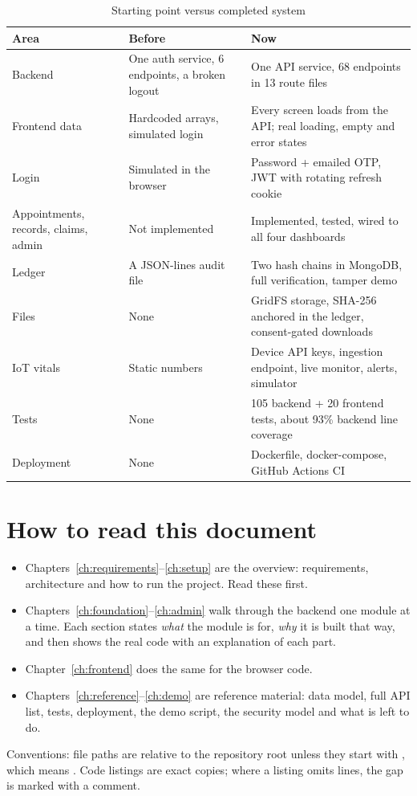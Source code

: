 \begin{table}[H]
\centering\small
\caption{Starting point versus completed system}\label{tab:before-after}
\begin{tabularx}{\textwidth}{@{}P{3.4cm}YY@{}}
\toprule
\textbf{Area} & \textbf{Before} & \textbf{Now} \\
\midrule
Backend & One auth service, 6 endpoints, a broken logout & One API service, 68 endpoints in 13 route files \\
Frontend data & Hardcoded arrays, simulated login & Every screen loads from the API; real loading, empty and error states \\
Login & Simulated in the browser & Password + emailed OTP, JWT with rotating refresh cookie \\
Appointments, records, claims, admin & Not implemented & Implemented, tested, wired to all four dashboards \\
Ledger & A JSON-lines audit file & Two hash chains in MongoDB, full verification, tamper demo \\
Files & None & GridFS storage, SHA-256 anchored in the ledger, consent-gated downloads \\
IoT vitals & Static numbers & Device API keys, ingestion endpoint, live monitor, alerts, simulator \\
Tests & None & 105 backend + 20 frontend tests, about 93\% backend line coverage \\
Deployment & None & Dockerfile, docker-compose, GitHub Actions CI \\
\bottomrule
\end{tabularx}
\end{table}

\section{How to read this document}

\begin{itemize}
  \item Chapters~\ref{ch:requirements}--\ref{ch:setup} are the overview:
    requirements, architecture and how to run the project. Read these first.
  \item Chapters~\ref{ch:foundation}--\ref{ch:admin} walk through the backend one
    module at a time. Each section states \emph{what} the module is for,
    \emph{why} it is built that way, and then shows the real code with an
    explanation of each part.
  \item Chapter~\ref{ch:frontend} does the same for the browser code.
  \item Chapters~\ref{ch:reference}--\ref{ch:demo} are reference material: data
    model, full API list, tests, deployment, the demo script, the security model
    and what is left to do.
\end{itemize}

Conventions: file paths are relative to the repository root unless they start
with , which means .
Code listings are exact copies; where a listing omits lines, the gap is marked
with a  comment.
